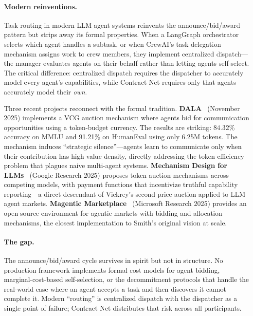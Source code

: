 \documentclass{article}
\begin{document}
\paragraph{Modern reinventions.}
Task routing in modern LLM agent systems reinvents the announce/bid/award pattern but
strips away its formal properties. When a LangGraph orchestrator selects which agent
handles a subtask, or when CrewAI's task delegation mechanism assigns work to crew
members, they implement centralized dispatch---the manager evaluates agents on their
behalf rather than letting agents self-select. The critical difference: centralized
dispatch requires the dispatcher to accurately model every agent's capabilities, while
Contract Net requires only that agents accurately model their \emph{own}.

Three recent projects reconnect with the formal tradition.
\textbf{DALA}~\citep{dala2025} (November 2025) implements a VCG auction mechanism where
agents bid for communication opportunities using a token-budget currency. The results are
striking: 84.32\% accuracy on MMLU and 91.21\% on HumanEval using only 6.25M tokens.
The mechanism induces ``strategic silence''---agents learn to communicate only when
their contribution has high value density, directly addressing the token efficiency
problem that plagues naive multi-agent systems.
\textbf{Mechanism Design for LLMs}~\citep{googlemechdesign2025} (Google Research 2025)
proposes token auction mechanisms across competing models, with payment functions that
incentivize truthful capability reporting---a direct descendant of Vickrey's
second-price auction applied to LLM agent markets.
\textbf{Magentic Marketplace}~\citep{magenticmarket2025} (Microsoft Research 2025)
provides an open-source environment for agentic markets with bidding and allocation
mechanisms, the closest implementation to Smith's original vision at scale.

\paragraph{The gap.}
The announce/bid/award cycle survives in spirit but not in structure. No production
framework implements formal cost models for agent bidding, marginal-cost-based
self-selection, or the decommitment protocols that handle the real-world case where
an agent accepts a task and then discovers it cannot complete it. Modern ``routing'' is
centralized dispatch with the dispatcher as a single point of failure; Contract Net
distributes that risk across all participants.
\end{document}
